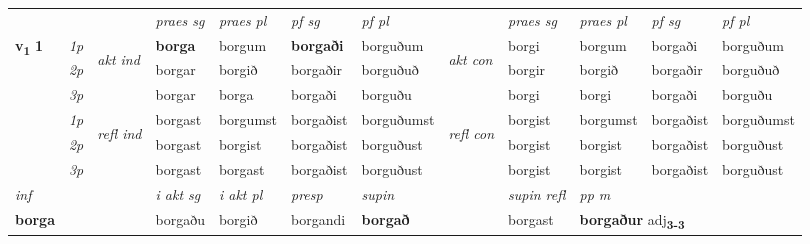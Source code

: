 
\begin{longtable}[l]{X>{\footnotesize\itshape}llXXXXlXXXX} \toprule
 & &   & \textit{praes sg}  & \textit{praes pl}    & \textit{ pf sg} & \textit{pf pl} & & \textit{praes sg}  & \textit{praes pl}    & \textit{pf sg} & \textit{pf pl }  \\ \cmidrule{4-7} \cmidrule{9-12}
 \multirow{2}{*}{{{\textbf{v{\textsubscript{1}}} \Large{\textbf{1}}}}}  & 1p & \multirow{3}{*}{\begin{turn}{90}\textit{akt ind}\end{turn}} & \textbf{borga} & borgum & \textbf{borgaði} & borguðum & \multirow{3}{*}{\begin{turn}{90}\textit{akt con}\end{turn}} &borgi & borgum & borgaði & borguðum\\*
 & 2p &  &  borgar  & borgið & borgaðir & borguðuð & & borgir & borgið & borgaðir & borguðuð \\*
 & 3p &  & borgar & borga & borgaði & borguðu & & borgi & borgi& borgaði & borguðu \\*
\cmidrule{4-7} \cmidrule{9-12}
 & 1p & \multirow{3}{*}{\begin{turn}{90}\textit{refl ind}\end{turn}}  & borgast & borgumst & borgaðist & borguðumst & \multirow{3}{*}{\begin{turn}{90}\textit{refl con}\end{turn}}  &borgist & borgumst & borgaðist & borguðumst \\*
 & 2p &  & borgast & borgist & borgaðist & borguðust & &borgist & borgist & borgaðist & borguðust \\*
 & 3p  & & borgast & borgast & borgaðist & borguðust & & borgist & borgist& borgaðist & borguðust \\*
\cmidrule{4-7} \cmidrule{9-12}

   {\textit{inf}} & &  & \textit{i akt sg} & \textit{i akt pl}   & \textit{presp} & \textit{supin} && \textit{supin refl} & \textit{pp m} \\*
  {\textbf{borga}} & && borgaðu  & borgið   & borgandi &  \textbf{borgað} && borgast & \multicolumn{2}{l}{\textbf{borgaður} adj\textbf{\textsubscript{3-3}}} \\*

\midrule


\end{longtable}
